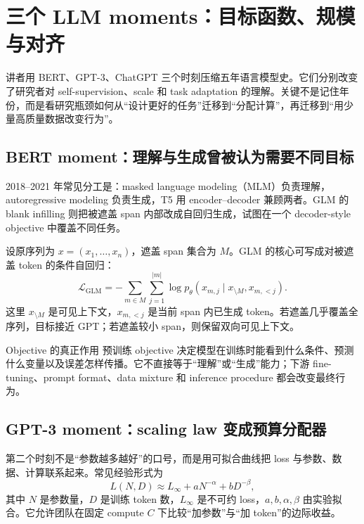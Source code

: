 \section{三个 LLM moments：目标函数、规模与对齐}

讲者用 BERT、GPT-3、ChatGPT 三个时刻压缩五年语言模型史。它们分别改变了研究者对 self-supervision、scale 和 task adaptation 的理解。关键不是记住年份，而是看研究瓶颈如何从“设计更好的任务”迁移到“分配计算”，再迁移到“用少量高质量数据改变行为”。

\subsection{BERT moment：理解与生成曾被认为需要不同目标}

2018--2021 年常见分工是：masked language modeling（MLM）负责理解，autoregressive modeling 负责生成，T5 用 encoder--decoder 兼顾两者。GLM 的 blank infilling 则把被遮盖 span 内部改成自回归生成，试图在一个 decoder-style objective 中覆盖不同任务。


设原序列为 $x=(x_1,\ldots,x_n)$，遮盖 span 集合为 $M$。GLM 的核心可写成对被遮盖 token 的条件自回归：
\[
\mathcal{L}_{\text{GLM}}
=-\sum_{m\in M}\sum_{j=1}^{|m|}
\log p_\theta\!\left(x_{m,j}\mid x_{\setminus M},x_{m,<j}\right).
\]
这里 $x_{\setminus M}$ 是可见上下文，$x_{m,<j}$ 是当前 span 内已生成 token。若遮盖几乎覆盖全序列，目标接近 GPT；若遮盖较小 span，则保留双向可见上下文。

\begin{knowledgebox}{Objective 的真正作用}
预训练 objective 决定模型在训练时能看到什么条件、预测什么变量以及误差怎样传播。它不直接等于“理解”或“生成”能力；下游 fine-tuning、prompt format、data mixture 和 inference procedure 都会改变最终行为。
\end{knowledgebox}


\subsection{GPT-3 moment：scaling law 变成预算分配器}

第二个时刻不是“参数越多越好”的口号，而是用可拟合曲线把 loss 与参数、数据、计算联系起来。常见经验形式为
\[
L(N,D)\approx L_\infty+aN^{-\alpha}+bD^{-\beta},
\]
其中 $N$ 是参数量，$D$ 是训练 token 数，$L_\infty$ 是不可约 loss，$a,b,\alpha,\beta$ 由实验拟合。它允许团队在固定 compute $C$ 下比较“加参数”与“加 token”的边际收益。

